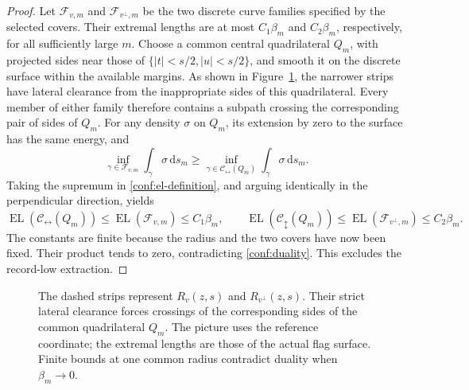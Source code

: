 \documentclass[11pt]{article}
\numberwithin{equation}{section}
\theoremstyle{definition}
\theoremstyle{remark}
\newcommand{\dd}{\mathrm d}
\newcommand{\1}{\mathbf 1}
\DeclareMathOperator{\EL}{EL}
\begin{document}
\begin{proof}
Let \(\mathcal F_{v,m}\) and \(\mathcal F_{v^\perp,m}\) be the
two discrete curve families specified by the selected covers.
Their extremal lengths are at most \(C_1\beta_m\) and
\(C_2\beta_m\), respectively, for all sufficiently large \(m\).
Choose a common central quadrilateral \(Q_m\), with projected
sides near those of \(\{|t|<s/2,|u|<s/2\}\), and smooth it on
the discrete surface within the available margins.  As shown in
Figure~\ref{conf:transverse-figure}, the narrower strips have lateral
clearance from the inappropriate sides of this quadrilateral.  Every
member of either family therefore contains a subpath crossing the
corresponding pair of sides of \(Q_m\).  For any density \(\sigma\) on
\(Q_m\), its extension by zero to the surface has the same energy,
and
\[
 \inf_{\gamma\in\mathcal F_{v,m}}\int_\gamma\sigma\,\dd s_m
 \ge
 \inf_{\gamma\in\mathcal C_{\leftrightarrow}(Q_m)}
                       \int_\gamma\sigma\,\dd s_m.
\]
Taking the supremum in \eqref{conf:el-definition}, and arguing
identically in the perpendicular direction, yields
\[
 \EL(\mathcal C_{\leftrightarrow}(Q_m))
       \le\EL(\mathcal F_{v,m})\le C_1\beta_m,
 \qquad
 \EL(\mathcal C_{\updownarrow}(Q_m))
       \le\EL(\mathcal F_{v^\perp,m})\le C_2\beta_m.
\]
The constants are finite because the radius and the two covers
have now been fixed.  Their product
tends to zero, contradicting \eqref{conf:duality}.  This excludes the
record-low extraction.
\end{proof}

\begin{figure}[tb]
\centering
{}

\caption{The dashed strips represent \(R_v(z,s)\) and
\(R_{v^\perp}(z,s)\).  Their strict lateral clearance forces
crossings of the corresponding sides of the common quadrilateral
\(Q_m\).  The picture uses the reference coordinate; the extremal lengths are those of the actual flag surface.
Finite bounds at one common radius contradict duality when
\(\beta_m\to0\).}
\label{conf:transverse-figure}
\end{figure}
\end{document}
